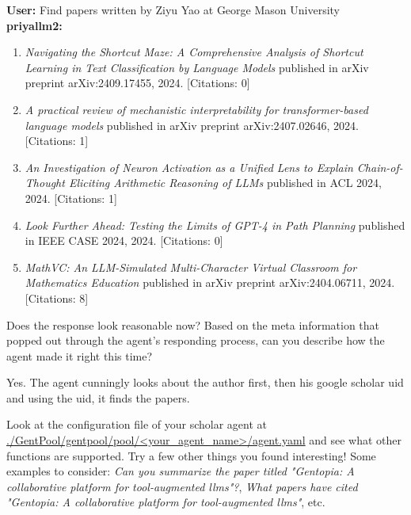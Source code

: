 \documentclass[11pt,addpoints,answers]{exam}
\begin{document}
\begin{questions}
    \begin{tcolorbox}[fit,height=6cm, width=16cm, blank, borderline={1pt}{-2pt},nobeforeafter]
    \textbf{User:} Find papers written by Ziyu Yao at George Mason University
    \\
    \textbf{priyallm2:} 
    \begin{enumerate}[label=\arabic*.]
    \item \textit{Navigating the Shortcut Maze: A Comprehensive Analysis of Shortcut Learning in Text Classification by Language Models} published in arXiv preprint arXiv:2409.17455, 2024. [Citations: 0]
    \item \textit{A practical review of mechanistic interpretability for transformer-based language models} published in arXiv preprint arXiv:2407.02646, 2024. [Citations: 1]
    \item \textit{An Investigation of Neuron Activation as a Unified Lens to Explain Chain-of-Thought Eliciting Arithmetic Reasoning of LLMs} published in ACL 2024, 2024. [Citations: 1]
    \item \textit{Look Further Ahead: Testing the Limits of GPT-4 in Path Planning} published in IEEE CASE 2024, 2024. [Citations: 0]
    \item \textit{MathVC: An LLM-Simulated Multi-Character Virtual Classroom for Mathematics Education} published in arXiv preprint arXiv:2404.06711, 2024. [Citations: 8]
\end{enumerate}
    \end{tcolorbox} 

    Does the response look reasonable now? Based on the meta information that popped out through the agent's responding process, can you describe how the agent made it right this time?

    \begin{tcolorbox}[fit,height=2cm, width=16cm, blank, borderline={1pt}{-2pt},nobeforeafter]
    Yes. The agent cunningly looks about the author first, then his google scholar uid and using the uid, it finds the papers.
    \end{tcolorbox}

    \question[5] Look at the configuration file of your scholar agent at \url{./GentPool/gentpool/pool/<your_agent_name>/agent.yaml} and see what other functions are supported. Try a few other things you found interesting!
    Some examples to consider: \textit{Can you summarize the paper titled "Gentopia: A collaborative platform for tool-augmented llms"?}, \textit{What papers have cited "Gentopia: A collaborative platform for tool-augmented llms"}, etc.
    

\end{questions}
\end{document}
